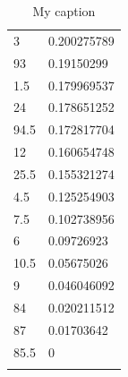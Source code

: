 \begin{longtable}{|l|l|}
	\rowcolor[HTML]{F8FF00} 
	3                                                       & 0.200275789                                                   \\
	\rowcolor[HTML]{32CB00} 
	93                                                      & 0.19150299                                                    \\
	\rowcolor[HTML]{32CB00} 
	1.5                                                     & 0.179969537                                                   \\
	\rowcolor[HTML]{32CB00} 
	24                                                      & 0.178651252                                                   \\
	\rowcolor[HTML]{32CB00} 
	94.5                                                    & 0.172817704                                                   \\
	\rowcolor[HTML]{32CB00} 
	12                                                      & 0.160654748                                                   \\
	\rowcolor[HTML]{32CB00} 
	25.5                                                    & 0.155321274                                                   \\
	\rowcolor[HTML]{32CB00} 
	4.5                                                     & 0.125254903                                                   \\
	\rowcolor[HTML]{32CB00} 
	7.5                                                     & 0.102738956                                                   \\
	\rowcolor[HTML]{32CB00} 
	6                                                       & 0.09726923                                                    \\
	\rowcolor[HTML]{32CB00} 
	10.5                                                    & 0.05675026                                                    \\
	\rowcolor[HTML]{32CB00} 
	9                                                       & 0.046046092                                                   \\
	\rowcolor[HTML]{32CB00} 
	84                                                      & 0.020211512                                                   \\
	\rowcolor[HTML]{32CB00} 
	87                                                      & 0.01703642                                                    \\
	\rowcolor[HTML]{32CB00} 
	85.5                                                    & 0                                                             \\ \hline
	\caption{My caption}
	\label{my-label1}
\end{longtable}

